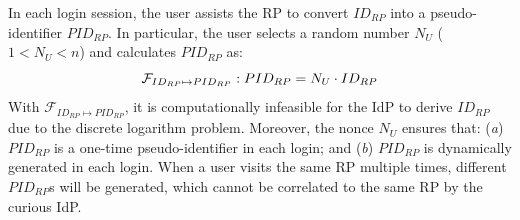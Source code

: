  In each login session, the user assists the RP to convert $ID_{RP}$ into a pseudo-identifier $PID_{RP}$. In particular, the user selects a random number $N_{U}$ ($1 < N_{U}<n$) and calculates $PID_{RP}$ as:
\begin{equation}
\setlength{\abovedisplayskip}{3pt}
\setlength{\belowdisplayskip}{3pt}
\mathcal{F}_{ID_{RP} \mapsto PID_{RP}}: PID_{RP} = {N_{U}} \cdot {ID_{RP}}
\label{equ:PIDRP}
\end{equation}
With $\mathcal{F}_{ID_{RP} \mapsto PID_{RP}}$,  %
it is computationally infeasible for the IdP to derive $ID_{RP}$ %
due to the discrete logarithm problem.
Moreover, the nonce $N_{U}$ ensures that: (\emph{a}) $PID_{RP}$ is a one-time pseudo-identifier in each login;  
and (\emph{b}) $PID_{RP}$ is dynamically generated in each login. 
When a user visits the same RP multiple times, different $PID_{RP}$s will be generated, which cannot be correlated to the same RP by the curious IdP.





